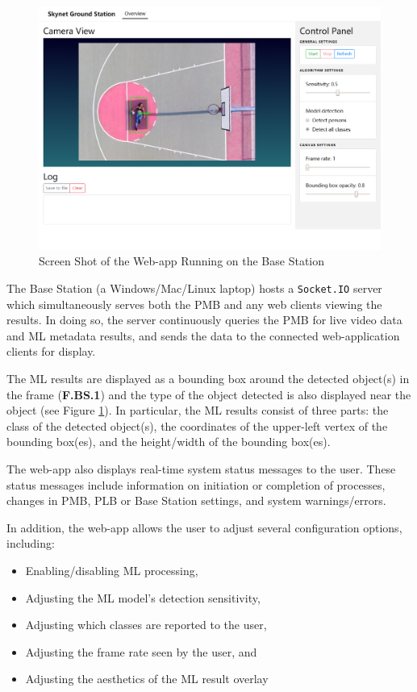 \begin{figure}[H]
\begin{mdframed}
\centering
\includegraphics[width=15cm]{img/base_station.png}
\end{mdframed}
\caption{Screen Shot of the Web-app Running on the Base Station}
\label{basestationdiag}
\end{figure}

The Base Station (a Windows/Mac/Linux laptop) hosts a \texttt{Socket.IO} server which simultaneously serves both the PMB and any web clients viewing the results. In doing so, the server continuously queries the PMB for live video data and ML metadata results, and sends the data to the connected web-application clients for display.

The ML results are displayed as a bounding box around the detected object(s) in the frame (\textbf{F.BS.1}) and the type of the object detected is also displayed near the object (see Figure \ref{basestationdiag}). In particular, the ML results consist of three parts: the class of the detected object(s), the coordinates of the upper-left vertex of the bounding box(es), and the height/width of the bounding box(es).

The web-app also displays real-time system status messages to the user. These status messages include information on initiation or completion of processes, changes in PMB, PLB or Base Station settings, and system warnings/errors.

In addition, the web-app allows the user to adjust several configuration options, including:

\begin{itemize}
\item Enabling/disabling ML processing,
\item Adjusting the ML model's detection sensitivity,
\item Adjusting which classes are reported to the user,
\item Adjusting the frame rate seen by the user, and
\item Adjusting the aesthetics of the ML result overlay
\end{itemize}

